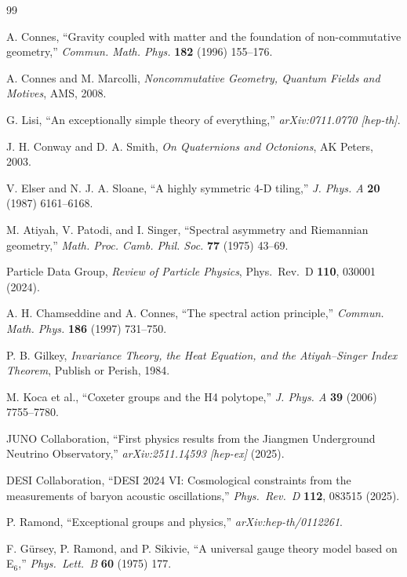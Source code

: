 \documentclass[11pt,a4paper]{article}
\theoremstyle{definition}
\begin{document}
\begin{thebibliography}{99}

A. Connes, ``Gravity coupled with matter and the foundation of
non-commutative geometry,'' \textit{Commun. Math. Phys.} \textbf{182} (1996)
155--176.

A. Connes and M. Marcolli, \textit{Noncommutative Geometry, Quantum Fields
and Motives}, AMS, 2008.

G. Lisi, ``An exceptionally simple theory of everything,''
\textit{arXiv:0711.0770 [hep-th]}.

J. H. Conway and D. A. Smith, \textit{On Quaternions and Octonions},
AK Peters, 2003.

V. Elser and N. J. A. Sloane, ``A highly symmetric 4-D tiling,''
\textit{J. Phys. A} \textbf{20} (1987) 6161--6168.

M. Atiyah, V. Patodi, and I. Singer, ``Spectral asymmetry and
Riemannian geometry,'' \textit{Math. Proc. Camb. Phil. Soc.} \textbf{77}
(1975) 43--69.

Particle Data Group, \textit{Review of Particle Physics}, Phys.\ Rev.\ D
\textbf{110}, 030001 (2024).

A. H. Chamseddine and A. Connes, ``The spectral action principle,''
\textit{Commun. Math. Phys.} \textbf{186} (1997) 731--750.

P. B. Gilkey, \textit{Invariance Theory, the Heat Equation, and the
Atiyah--Singer Index Theorem}, Publish or Perish, 1984.

M. Koca et al., ``Coxeter groups and the H4 polytope,''
\textit{J. Phys. A} \textbf{39} (2006) 7755--7780.

JUNO Collaboration, ``First physics results from the Jiangmen Underground
Neutrino Observatory,'' \textit{arXiv:2511.14593 [hep-ex]} (2025).

DESI Collaboration, ``DESI 2024 VI: Cosmological constraints from the
measurements of baryon acoustic oscillations,''
\textit{Phys.\ Rev.\ D} \textbf{112}, 083515 (2025).

P. Ramond, ``Exceptional groups and physics,''
\textit{arXiv:hep-th/0112261}.

F. G\"{u}rsey, P. Ramond, and P. Sikivie,
``A universal gauge theory model based on E$_6$,''
\textit{Phys.\ Lett.\ B} \textbf{60} (1975) 177.

\end{thebibliography}
\end{document}
